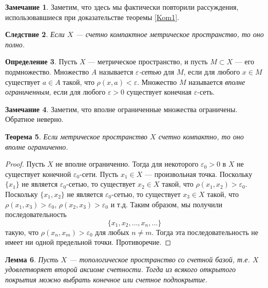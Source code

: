 \documentclass[12pt, titlepage, oneside]{amsbook}
\newtheorem{theorem}{Теорема}[chapter]
\newtheorem{lemma}[theorem]{Лемма}
\newtheorem{corollary}[theorem]{Следствие}
\theoremstyle{definition}
\newtheorem{definition}[theorem]{Определение}
\newtheorem{remark}[theorem]{Замечание}
\theoremstyle{remark}
\begin{document}
\begin{remark}
Заметим, что здесь мы фактически повторили рассуждения, использовавшиеся при доказательстве теоремы \ref{Kom1}.
\end{remark}

 \begin{corollary}
\label{Kom5-1}
Если $X$ --- счетно компактное метрическое пространство, то оно полно.
\end{corollary}

\begin{definition}
Пусть $X$ --- метрическое пространство, и пусть $M\subset X$ --- его подмножество. Множество $A$ называется \emph{$\varepsilon$-сетью} для $M$, если для любого $x\in M$ существует $a\in A$ такой, что $\rho(x,a)<\varepsilon$. Множество $M$ называется \emph{вполне ограниченным}, если для любого $\varepsilon>0$ существует конечная $\varepsilon$-сеть.
\end{definition}

\begin{remark}
Заметим, что вполне ограниченные множества ограничены. Обратное неверно.
\end{remark}


 \begin{theorem}
\label{Kom6}
Если метрическое пространство $X$ счетно компактно, то оно вполне ограниченно.
\end{theorem}

\begin{proof}
Пусть $X$ не вполне ограниченно. Тогда для некоторого $\varepsilon_0>0$ в $X$ не существует конечной $\varepsilon_0$-сети. Пусть $x_1\in X$ --- произвольная точка. Поскольку $\{x_1\}$ не является $\varepsilon_0$-сетью, то существует $x_2\in X$ такой, что $\rho(x_1,x_2)>\varepsilon_0$. Поскольку $\{x_1,x_2\}$ не является $\varepsilon_0$-сетью, то существует $x_3\in X$ такой, что $\rho(x_1,x_3)>\varepsilon_0$, $\rho(x_2,x_3)>\varepsilon_0$ и т.д. Таким образом, мы получили последовательность $$\{x_1,x_2,\ldots,x_n,\ldots\}$$ такую, что $\rho(x_n,x_m)>\varepsilon_0$ для любых $n\neq m$. Тогда эта последовательность не имеет ни одной предельной точки. Противоречие.
\end{proof}

\begin{lemma}
\label{LemKom}
Пусть $X$ --- топологическое пространство со счетной базой, т.е. $X$ удовлетворяет второй аксиоме счетности. Тогда из всякого открытого покрытия можно выбрать конечное или счетное подпокрытие.
\end{lemma}
\end{document}
